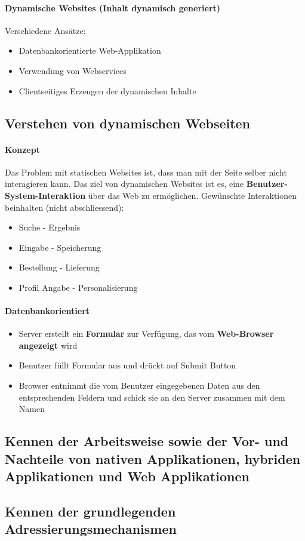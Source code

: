 \documentclass[10pt,a4paper]{article}
\begin{document}
\paragraph*{Dynamische Websites (Inhalt dynamisch generiert)} Verschiedene Ansätze:
\begin{itemize}[noitemsep,topsep=0pt,leftmargin=*]
    \item Datenbankorientierte Web-Applikation
    \item Verwendung von Webservices
    \item Clientseitiges Erzeugen der dynamischen Inhalte
\end{itemize}

\subsection{Verstehen von dynamischen Webseiten}
\paragraph*{Konzept}Das Problem mit statischen Websites ist, dass man mit der Seite selber nicht interagieren kann. Das ziel von dynamischen Websites ist es, eine \textbf{Benutzer-System-Interaktion} über das Web zu ermöglichen. Gewünschte Interaktionen beinhalten (nicht abschliessend):
\begin{itemize}[noitemsep,topsep=0pt,leftmargin=*]
    \item Suche - Ergebnis
    \item Eingabe - Speicherung
    \item Bestellung - Lieferung
    \item Profil Angabe - Personalisierung
\end{itemize}
\paragraph*{Datenbankorientiert}
\begin{itemize}[noitemsep,topsep=0pt,leftmargin=*]
    \item Server erstellt ein \textbf{Formular} zur Verfügung, das vom \textbf{Web-Browser angezeigt} wird
    \item Benutzer füllt Formular aus und drückt auf Submit Button
    \item Browser entnimmt die vom Benutzer eingegebenen Daten aus den entsprechenden Feldern und schick sie an den Server zusammen mit dem Namen
\end{itemize}

\subsection{Kennen der Arbeitsweise sowie der Vor- und Nachteile von nativen Applikationen, hybriden Applikationen und Web Applikationen}
\paragraph*{}

\subsection{Kennen der grundlegenden Adressierungsmechanismen}
\paragraph*{}
\end{document}
